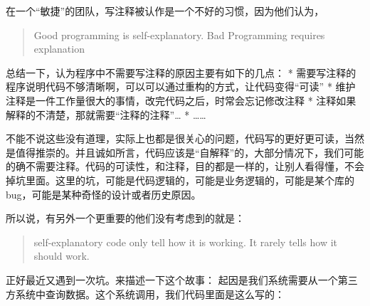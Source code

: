\documentclass[12pt]{article}
\begin{document}
\makeblogtitle

在一个``敏捷''的团队，写注释被认作是一个不好的习惯，因为他们认为，

\begin{quote}
Good programming is self-explanatory. Bad Programming requires explanation
\end{quote}

总结一下，认为程序中不需要写注释的原因主要有如下的几点： * 需要写注释的程序说明代码不够清晰啊，可以可以通过重构的方式，让代码变得``可读'' * 维护注释是一件工作量很大的事情，改完代码之后，时常会忘记修改注释 * 注释如果解释的不清楚，那就需要``注释的注释''\ldots{} * \ldots\ldots{}

不能不说这些没有道理，实际上也都是很关心的问题，代码写的更好更可读，当然是值得推崇的。并且诚如所言，代码应该是``自解释''的，大部分情况下，我们可能的确不需要注释。代码的可读性，和注释，目的都是一样的，让别人看得懂，不会掉坑里面。这里的坑，可能是代码逻辑的，可能是业务逻辑的，可能是某个库的bug，可能是某种奇怪的设计或者历史原因。

所以说，有另外一个更重要的他们没有考虑到的就是：

\begin{quote}
self-explanatory code only tell how it is working. It rarely tells how it should work.
\end{quote}

正好最近又遇到一次坑。来描述一下这个故事： 起因是我们系统需要从一个第三方系统中查询数据。这个系统调用，我们代码里面是这么写的：

\begin{Shaded}
\begin{Highlighting}[]
 \OperatorTok{\{}
    \OperatorTok{(}\OperatorTok{);}
\OperatorTok{\}}  \OperatorTok{(}\OperatorTok{)} \OperatorTok{\{}
\OperatorTok{(}\OperatorTok{,}\OperatorTok{);}
      \OperatorTok{(}\OperatorTok{(}\OperatorTok{()));}
\OperatorTok{\}}
\end{Highlighting}
\end{Shaded}
\end{document}
